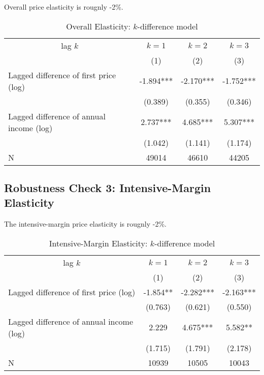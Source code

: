 \documentclass[ review  , 3p ]{elsarticle}
\begin{document}
  Overall price elasticity is rougnly -2\%.
  
  \begin{table}
  
  \caption{\label{tab:kablekDiffElasticitySlide1}Overall Elasticity: $k$-difference model}
  \centering
  \fontsize{8}{10}\selectfont
  \begin{tabular}[t]{lccc}
  \toprule
  \multicolumn{1}{c}{lag $k$} & \multicolumn{1}{c}{$k = 1$} & \multicolumn{1}{c}{$k = 2$} & \multicolumn{1}{c}{$k = 3$} \\
  \cmidrule(l{3pt}r{3pt}){1-1} \cmidrule(l{3pt}r{3pt}){2-2} \cmidrule(l{3pt}r{3pt}){3-3} \cmidrule(l{3pt}r{3pt}){4-4}
   & (1) & (2) & (3)\\
  \midrule
  Lagged difference of first price (log) & -1.894*** & -2.170*** & -1.752***\\
   & (0.389) & (0.355) & (0.346)\\
  Lagged difference of annual income (log) & 2.737*** & 4.685*** & 5.307***\\
   & (1.042) & (1.141) & (1.174)\\
  N & 49014 & 46610 & 44205\\
  \bottomrule
  \end{tabular}
  \end{table}
  
  \hypertarget{robustness-check-3-intensive-margin-elasticity}{%
  \subsection{Robustness Check 3: Intensive-Margin Elasticity}\label{robustness-check-3-intensive-margin-elasticity}}
  
  The intensive-margin price elasticity is rougnly -2\%.
  
  \begin{table}
  
  \caption{\label{tab:kablekDiffElasticitySlide2}Intensive-Margin Elasticity: $k$-difference model}
  \centering
  \fontsize{8}{10}\selectfont
  \begin{tabular}[t]{lccc}
  \toprule
  \multicolumn{1}{c}{lag $k$} & \multicolumn{1}{c}{$k = 1$} & \multicolumn{1}{c}{$k = 2$} & \multicolumn{1}{c}{$k = 3$} \\
  \cmidrule(l{3pt}r{3pt}){1-1} \cmidrule(l{3pt}r{3pt}){2-2} \cmidrule(l{3pt}r{3pt}){3-3} \cmidrule(l{3pt}r{3pt}){4-4}
   & (1) & (2) & (3)\\
  \midrule
  Lagged difference of first price (log) & -1.854** & -2.282*** & -2.163***\\
   & (0.763) & (0.621) & (0.550)\\
  Lagged difference of annual income (log) & 2.229 & 4.675*** & 5.582**\\
   & (1.715) & (1.791) & (2.178)\\
  N & 10939 & 10505 & 10043\\
  \bottomrule
  \end{tabular}
  \end{table}
  
\end{document}
